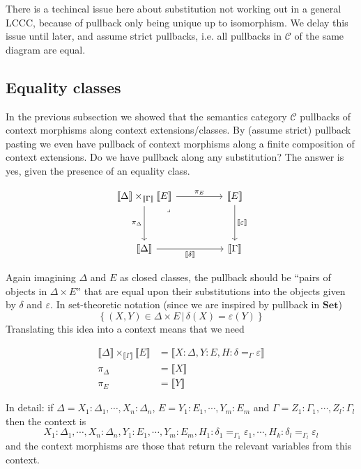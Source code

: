 \message{ !name(LF+Equality_LCCC.tex)}\documentclass{article}
\newcommand{\bbrkt}[1]{\llbracket #1 \rrbracket}
\newcommand{\EqCS}[3]{#2 =_{#1} #3}
\newcommand{\set}[1]{\left\{#1\right\}}
\newcommand{\st}{\,|\,}
\newcommand{\<}{\langle}
\renewcommand{\>}{\rangle}
\newcommand{\de}{\delta}
\newcommand{\ep}{\varepsilon}
\newcommand{\Ga}{\Gamma}
\newcommand{\De}{\Delta}
\newcommand{\CC}{\mathcal{C}}
\newcommand{\SET}{\mathbf{Set}}
\theoremstyle{definitionstyle}
\theoremstyle{exercisestyle}
\theoremstyle{remarkstyle}
\begin{document}
There is a techincal issue here about substitution not working out in a general LCCC,
because of pullback only being unique up to isomorphism.
We delay this issue until later,
and assume strict pullbacks,
i.e. all pullbacks in $\CC$ of the same diagram are equal. %

\subsection{Equality classes}
In the previous subsection we showed that the semantics category $\CC$
pullbacks of context morphisms along context extensions/classes.
By (assume strict) pullback pasting \cite{pullback_pasting} we even have pullback of context morphisms along
a finite composition of context extensions.
Do we have pullback along any substitution?
The answer is yes, given the presence of an equality class.

\[\begin{tikzcd}
  {\bbrkt{\De} \times_{\bbrkt{\Ga}} \bbrkt{E}} && \bbrkt{E} \\
  \\
  \bbrkt{\De} && \bbrkt{\Ga}
  \arrow["\pi_{E}", from=1-1, to=1-3]
  \arrow["\bbrkt{\de}"', from=3-1, to=3-3]
  \arrow["\bbrkt{\ep}", from=1-3, to=3-3]
  \arrow["\pi_{\De}"', from=1-1, to=3-1]
  \arrow["\lrcorner"{anchor=center, pos=0.125}, draw=none, from=1-1, to=3-3]
\end{tikzcd}\]

Again imagining $\De$ and $E$ as closed classes,
the pullback should be ``pairs of objects in $\De \times E$'' that
are equal upon their substitutions into the objects given by $\de$ and $\ep$.
In set-theoretic notation (since we are inspired by pullback in $\SET$)
\[ \set{ (X,Y) \in \De \times E \st \de(X) = \ep(Y) }\]
Translating this idea into a context means that we need

\begin{align*}
  {\bbrkt{\De} \times_{\bbrkt{\Ga}} \bbrkt{E}} & = \bbrkt{X : \De, Y : E, H : \EqCS{\Ga}{\de}{\ep}}\\
  \pi_{\De} & = \bbrkt{ X } \\
  \pi_{E} & = \bbrkt{ Y }
\end{align*}

In detail: if $\De = X_{1} : \De_{1}, \cdots , X_{n} : \De_{n}$, $E = Y_{1} : E_{1}, \cdots, Y_{m} : E_{m}$
and $\Ga = Z_{1} : \Ga_{1}, \cdots , Z_{l} : \Ga_{l}$
then the context is
\[X_{1} : \De_{1}, \cdots , X_{n} : \De_{n}, Y_{1} : E_{1}, \cdots, Y_{m} : E_{m} ,
  H_{1} : \EqCS{\Ga_{1}}{\de_{1}}{\ep_{1}}, \cdots , H_{k} : \EqCS{\Ga_{l}}{\de_{l}}{\ep_{l}}\]
and the context morphisms are those that return the relevant variables from this context.
\end{document}
